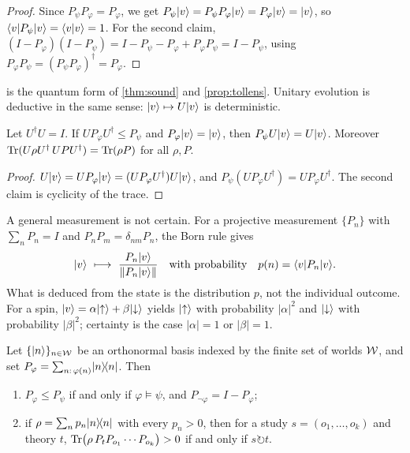 \begin{proof}
Since $P_\psi P_\varphi=P_\varphi$, we get $P_\psi\lvert v\rangle=P_\psi P_\varphi\lvert v\rangle=P_\varphi\lvert v\rangle=\lvert v\rangle$,
so $\langle v\rvert P_\psi\lvert v\rangle=\langle v\vert v\rangle=1$. For the second claim,
$(I-P_\varphi)(I-P_\psi)=I-P_\psi-P_\varphi+P_\varphi P_\psi=I-P_\psi$, using
$P_\varphi P_\psi=(P_\psi P_\varphi)^\dagger=P_\varphi$.
\end{proof}

 is the quantum form of \cref{thm:sound} and \cref{prop:tollens}. Unitary
evolution is deductive in the same sense: $\lvert v\rangle\mapsto U\lvert v\rangle$ is deterministic.

\begin{proposition}\label{prop:unitary}
Let $U^\dagger U=I$. If $UP_\varphi U^\dagger\le P_\psi$ and $P_\varphi\lvert v\rangle=\lvert v\rangle$, then
$P_\psi U\lvert v\rangle=U\lvert v\rangle$. Moreover $\operatorname{Tr}(U\rho U^\dagger\,UPU^\dagger)=\operatorname{Tr}(\rho P)$ for all $\rho,P$.
\end{proposition}

\begin{proof}
$U\lvert v\rangle=UP_\varphi\lvert v\rangle=(UP_\varphi U^\dagger)U\lvert v\rangle$, and $P_\psi(UP_\varphi U^\dagger)=UP_\varphi U^\dagger$.
The second claim is cyclicity of the trace.
\end{proof}

A general measurement is not certain. For a projective measurement $\{P_n\}$ with
$\sum_n P_n=I$ and $P_nP_m=\delta_{nm}P_n$, the Born rule gives
\[
  \ket v\ \longmapsto\ \frac{P_n\ket v}{\lVert P_n\ket v\rVert}
  \quad\text{with probability}\quad p(n)=\bra vP_n\ket v .
\]
What is deduced from the state is the distribution $p$, not the individual outcome. For a spin,
$\lvert v\rangle=\alpha\lvert {\uparrow}\rangle+\beta\lvert {\downarrow}\rangle$ yields $\lvert {\uparrow}\rangle$ with probability $|\alpha|^2$ and
$\lvert {\downarrow}\rangle$ with probability $|\beta|^2$; certainty is the case $|\alpha|=1$ or $|\beta|=1$.

\begin{proposition}\label{prop:classical}
Let $\{\lvert n\rangle\}_{n\in\mathcal W}$ be an orthonormal basis indexed by the finite set of worlds $\mathcal W$, and set
$P_\varphi=\sum_{n:\,\varphi(n)}\lvert n\rangle\!\langle n\rvert$. Then
\begin{enumerate}
  \item $P_\varphi\le P_\psi$ if and only if $\varphi\models\psi$, and $P_{\neg\varphi}=I-P_\varphi$;
  \item if $\rho=\sum_n p_n\lvert n\rangle\!\langle n\rvert$ with every $p_n>0$, then for a study
        $s=(o_1,\dots,o_k)$ and theory $t$,
        $\operatorname{Tr}\bigl(\rho\,P_t P_{o_1}\cdots P_{o_k}\bigr)>0$ if and only if $s\circlearrowright t$.
\end{enumerate}
\end{proposition}

